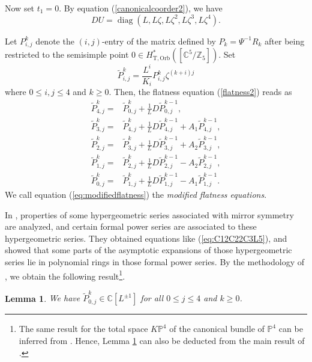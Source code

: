 \documentclass[12pt]{amsart}
\newtheorem{lem}[prop]{Lemma}
\numberwithin{equation}{section}
\DeclareMathOperator{\diag}{diag}
\begin{document}
Now set $t_1=0$. By equation (\ref{canonicalcoorder2}), we have 
\begin{equation}\label{DU}
DU=\diag(L,L\zeta,L\zeta^2,L\zeta^3,L\zeta^4).
\end{equation}


Let $P_{i,j}^k$ denote the $(i,j)$-entry of the matrix defined by $P_k=\Psi^{-1}R_k$ after being restricted to the semisimple point $0\in H^*_{\mathrm{T,Orb}}\left([\mathbb{C}^5/\mathbb{Z}_5]\right)$. Set \begin{equation*}
\widetilde{P}_{i,j}^k=\frac{L^i}{K_i}P_{i,j}^k\zeta^{(k+i)j}
\end{equation*}
where $0\leq i,j \leq{4}$ and $k\geq 0$. Then, the flatness equation (\ref{flatness2}) reads as
\begin{equation}\label{eq:modifiedflatness}
\begin{aligned}
\widetilde{P}_{4,j}^k=&\widetilde{P}_{0,j}^k+\frac{1}{L}D\widetilde{P}_{0,j}^{k-1},\\
\widetilde{P}_{3,j}^k=&\widetilde{P}_{4,j}^k+\frac{1}{L}D\widetilde{P}_{4,j}^{k-1}+A_1\widetilde{P}_{4,j}^{k-1},\\
\widetilde{P}_{2,j}^k=&\widetilde{P}_{3,j}^k+\frac{1}{L}D\widetilde{P}_{3,j}^{k-1}+A_2\widetilde{P}_{3,j}^{k-1},\\
\widetilde{P}_{1,j}^k=&\widetilde{P}_{2,j}^k+\frac{1}{L}D\widetilde{P}_{2,j}^{k-1}-A_2\widetilde{P}_{2,j}^{k-1},\\
\widetilde{P}_{0,j}^k=&\widetilde{P}_{1,j}^k+\frac{1}{L}D\widetilde{P}_{1,j}^{k-1}-A_1\widetilde{P}_{1,j}^{k-1}.
\end{aligned}
\end{equation}
We call equation (\ref{eq:modifiedflatness}) the \textit{modified flatness equations}.

In \cite{zz}, properties of some hypergeometric series associated with mirror symmetry are analyzed, and certain formal power series are associated to these hypergeometric series. They obtained equations like (\ref{eq:C12C22C3L5}), and showed that some parts of the asymptotic expansions of those hypergeometric series lie in polynomial rings in those formal power series. By the methodology of \cite{zz}, we obtain the following result\footnote{The same result for the total space $K\mathbb{P}^4$ of the canonical bundle of $\mathbb{P}^4$ can be inferred from \cite[Proposition 14]{lho}. Hence, Lemma \ref{lem:P0jk_is_in_CLplusminus} can also be deducted from the main result of \cite{lho}.}.
\begin{lem}\label{lem:P0jk_is_in_CLplusminus}
We have $\widetilde{P}_{0,j}^k\in\mathbb{C}[L^{\pm 1}]$ for all $0\leq{j}\leq{4}$ and $k\geq{0}$.
\end{lem}
\end{document}
